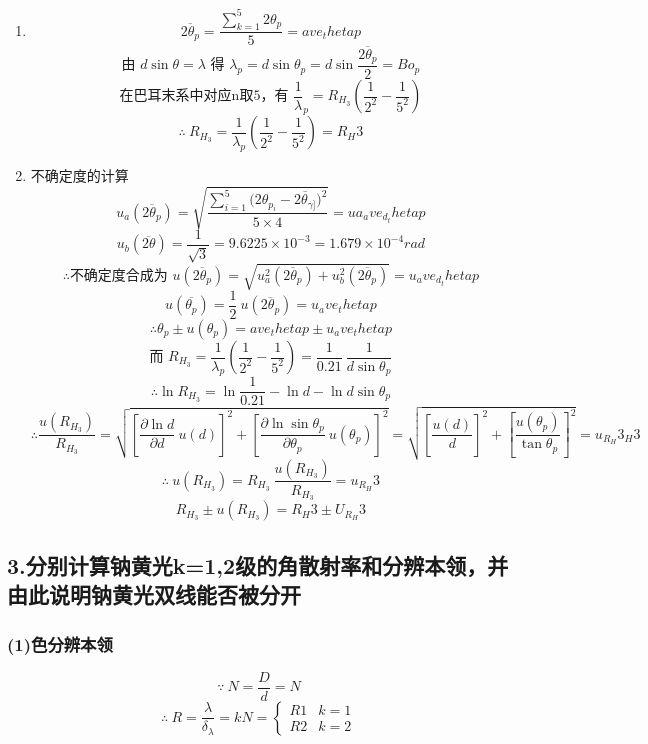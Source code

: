 \begin{enumerate}
  \item { }
      $$\overline{2{\theta}_p} = \displaystyle\frac{\sum_{k=1}^5 2{\theta}_p}{5} = {{ave_thetap}}$$
      $$\displaystyle\text{由\ }d\sin{\theta} = {\lambda}\text{\ 得\ }{\lambda}_p = d\sin{\theta}_p = d\sin{\frac{\overline{2{\theta}_p}}{2}} = {{Bo_p}}$$
      $$\displaystyle\text{在巴耳末系中对应n取5，有\ }\frac{1}{\lambda}_p = R_{H_3}\left(\frac{1}{2^2}-\frac{1}{5^2}\right)$$
      $$\therefore\ \displaystyle R_{H_3} = \frac{1}{ {\lambda}_p}\left(\frac{1}{2^2}-\frac{1}{5^2}\right) = {{R_H3}}$$
  \item {不确定度的计算}
      $$u_a(\overline{2{\theta}_p}) = \displaystyle\sqrt{\frac{\sum_{i=1}^5{(2{\theta}_{p_{i}}-\overline{2{\theta}_{\gamma]}}})^2}{5\times4}}={{ua_ave_d_thetap}}$$
      $$u_b(\overline{2\theta}) = \displaystyle\frac{1}{\sqrt3} = 9.6225\times10^{-3} = 1.679 \times 10^{-4} rad$$
      $$\therefore\text{不确定度合成为\ }u(\overline{2{\theta}_p}) = \sqrt{u_a^2(\overline{2{\theta}_p})+u_b^2(\overline{2{\theta}_p})} = {{u_ave_d_thetap}}$$
      $$u(\overline{ {\theta}_p})= \displaystyle\frac12\ u(\overline{2{\theta}_p}) = {{u_ave_thetap}}$$
      $$\therefore{\theta}_p \pm u({\theta}_p) = {{ave_thetap}} \pm {{u_ave_thetap}}$$
      $$\text{而\ }\displaystyle R_{H_3} = \frac{1}{ {\lambda}_p}\left(\frac{1}{2^2}-\frac{1}{5^2}\right) = \frac{1}{0.21}\ \frac{1}{d\sin{\theta}_p}$$
      $$\therefore\ln{R_{H_3}} = \ln{\frac{1}{0.21}} -\ln{d} - \ln{d\sin{\theta}_p}$$
      $$\therefore\displaystyle \frac{u(R_{H_3})}{R_{H_3}} = \sqrt{ {\left[\frac{\partial{\ln{d}}}{\partial{d}}\ u(d)\right]}^2 + {\left[\frac{\partial{\ln{\sin{ {\theta}_p}}}}{\partial{ {\theta}_p}}\ u({\theta}_p)\right]}^2} = \sqrt{ {\left[\frac{u(d)}{d}\right]}^2 + {\left[\frac{u({\theta}_p)}{\tan{ {\theta}_p}}\right]}^2} = {{u_R_H3_H3}}$$
      $$\therefore \ u(R_{H_3}) = \displaystyle R_{H_3}\ \frac{u(R_{H_3})}{R_{H_3}} = {{u_R_H3}}$$ 
      $$R_{H_3} \pm u(R_{H_3}) = {{R_H3}} \pm {{U_R_H3}}$$
\end{enumerate}

\subsection*{3.分别计算钠黄光k=1,2级的角散射率和分辨本领，并由此说明钠黄光双线能否被分开}
\subsubsection*{(1)色分辨本领}
$$\because\ N = \displaystyle\frac{D}{d} = {{N}}$$
$$\therefore\ R = \displaystyle\frac{\lambda}{ {\delta}_{\lambda}} = kN = \begin{cases} {{R1}} & k=1 \\ {{R2}} & k=2 \end{cases} $$
